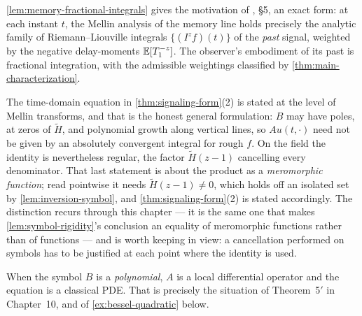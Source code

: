 \begin{remark}\label{rem:embodiment}
\ref{lem:memory-fractional-integrals} gives the motivation of
, \S5, an exact form: at each instant $t$, the Mellin analysis
of the memory line holds precisely the analytic family of Riemann--Liouville integrals
$\{(I^z f)(t)\}$ of the \emph{past} signal, weighted by the negative delay-moments
$\mathbb{E}[T_1^{-z}]$. The observer's embodiment of its past is fractional integration, with the
admissible weightings classified by \ref{thm:main-characterization}.
\end{remark}

\begin{remark}\label{rem:poles}
The time-domain equation in \ref{thm:signaling-form}(2) is stated at the level of Mellin
transforms, and that is the honest general formulation: $B$ may have poles, at zeros of
$\tilde H$, and polynomial growth along vertical lines, so $A u(t, \cdot)$ need not be given by
an absolutely convergent integral for rough $f$. On the field the identity is nevertheless
regular, the factor $\tilde H(z-1)$ cancelling every denominator. That last statement is about the
product as a \emph{meromorphic function}; read pointwise it needs $\tilde H(z-1) \ne 0$, which
holds off an isolated set by \ref{lem:inversion-symbol}, and \ref{thm:signaling-form}(2) is stated
accordingly. The distinction recurs through this chapter --- it is the same one that makes
\ref{lem:symbol-rigidity}'s conclusion an equality of meromorphic functions rather than of
functions --- and is worth keeping in view: a cancellation performed on symbols has to be
justified at each point where the identity is used.

When the symbol $B$ is a \emph{polynomial}, $A$ is a local differential operator and the
equation is a classical PDE. That is precisely the situation of Theorem~5$'$ in Chapter~10,
and of \ref{ex:bessel-quadratic} below.
\end{remark}

